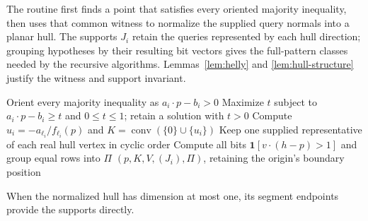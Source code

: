 The routine first finds a point that satisfies every oriented majority
inequality, then uses that common witness to normalize the supplied
query normals into a planar hull. The supports $J_i$ retain the
queries represented by each hull direction; grouping hypotheses by
their resulting bit vectors gives the full-pattern classes needed by
the recursive algorithms. Lemmas~\ref{lem:helly} and
\ref{lem:hull-structure} justify the witness and support invariant.

\begin{algorithm}[H]
\caption{\HullData: a flat state's witness, supports, and patterns}
\label{alg:hull-data}
Orient every majority inequality as $a_i\cdot p-b_i>0$\;
Maximize $t$ subject to $a_i\cdot p-b_i\ge t$ and $0\le t\le1$;
retain a solution with $t>0$\;
Compute $u_i=-a_{\ell_i}/f_{\ell_i}(p)$ and
$K=\operatorname{conv}(\{0\}\cup\{u_i\})$\;
Keep one supplied representative of each real hull vertex in cyclic order\;
Compute all bits $\mathbf1[v\cdot(h-p)>1]$ and group equal rows into $\Pi$\;
\KwRet $(p,K,V,(J_i),\Pi)$, retaining the origin's boundary position\;
\end{algorithm}

When the normalized hull has dimension at most one, its segment
endpoints provide the supports directly.
